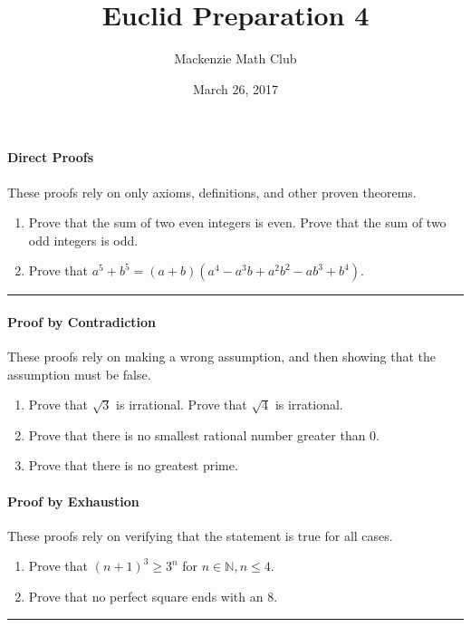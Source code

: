 

\usepackage{cleveref}
\usepackage{tikz}
\usepackage{tkz-euclide}
\usetikzlibrary{angles,quotes}

\title{Euclid Preparation 4}
\author{Mackenzie Math Club}
\date{March 26, 2017}



	\paragraph{Direct Proofs} These proofs rely on only axioms, definitions, and other proven theorems.\\
	\begin{enumerate}
		\item Prove that the sum of two even integers is even. Prove that the sum of two odd integers is odd.\solutionspace{2cm}
		\item Prove that $a^5+b^5=(a+b)(a^4-a^3b+a^2b^2-ab^3+b^4)$. \solutionspace{3cm}
	\end{enumerate}
	\hrule
	\paragraph{Proof by Contradiction} These proofs rely on making a wrong assumption, and then showing that the assumption must be false.
	\begin{enumerate}
		\item Prove that $\sqrt3$ is irrational. Prove that $\sqrt4$ is irrational. \solutionspace{2cm} 
		\item Prove that there is no smallest rational number greater than 0. \solutionspace{2cm}
		\item Prove that there is no greatest prime. \solutionspace{4cm}
	\end{enumerate}
	\paragraph{Proof by Exhaustion} These proofs rely on verifying that the statement is true for all cases.
	\begin{enumerate}
		\item Prove that $(n+1)^3 \geq 3^n$ for $n\in \mathbb{N}, n\leq4$.\solutionspace{1cm}
		\item Prove that no perfect square ends with an 8. \solutionspace{2cm}
	\end{enumerate}
	\hrule
